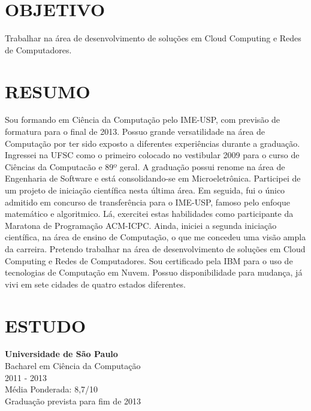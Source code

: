 \documentclass[margin=<value>,11pt]{res} %
\begin{document}

\address{R. Indiana, 998 -- São Paulo, SP 04562-001\\
        (11) 97132-1145, (11) 2389-7150 \\ \texttt{pedro@vezza.com.br}}

\begin{resume}
 
\section{OBJETIVO}  
     Trabalhar na área de desenvolvimento de soluções em Cloud Computing e Redes de Computadores.
 
\section{RESUMO}
Sou formando em Ciência da Computação pelo IME-USP, com previsão de formatura para o final de 2013. Possuo grande versatilidade na área de Computação por ter sido exposto a diferentes experiências durante a graduação. Ingressei na UFSC como o primeiro colocado no vestibular 2009 para o curso de Ciências da Computacão e 89º geral. A graduação possui renome na área de Engenharia de Software e está consolidando-se em Microeletrônica. Participei de um projeto de iniciação científica nesta última área. Em seguida, fui o único admitido em concurso de transferência para o IME-USP, famoso pelo enfoque matemático e algoritmico. Lá, exercitei estas habilidades como participante da Maratona de Programação ACM-ICPC. Ainda, iniciei a segunda iniciação científica, na área de ensino de Computação, o que me concedeu uma visão ampla da carreira. Pretendo trabalhar na área de desenvolvimento de soluções em Cloud Computing e Redes de Computadores. Sou certificado pela IBM para o uso de tecnologias de Computação em Nuvem. Possuo disponibilidade para mudança, já vivi em sete cidades de quatro estados diferentes.

\section{ESTUDO} 
	{\bf Universidade de São Paulo}\\
	Bacharel em Ciência da Computação \\
	2011 - 2013 \\
	Média Ponderada: 8,7/10 \\
	Graduação prevista para fim de 2013


\end{resume}
\end{document}
